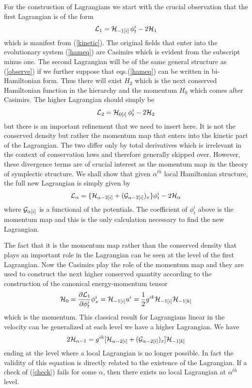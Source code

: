 \documentclass[a4paper,12pt]{article}
\begin{document}
For the construction of Lagrangians we start with the crucial
observation that the first Lagrangian is of the form
\begin{equation}
{\cal L}_1 = {\cal H}_{-1 [i]} \, \phi^i_t - 2 {\cal H}_1
\label{observe}
\end{equation}
which is manifest from (\ref{kinetic}). The original fields that
enter into the evolutionary system (\ref{hameq}) are Casimirs
which is evident from the subscript minus one. The second
Lagrangian will be of the same general structure as
(\ref{observe}) if we further suppose that eqs.(\ref{hameq}) can
be written in bi-Hamiltonian form. Thus there will exist $H_2$
which is the next conserved Hamiltonian function in the hierarchy
and the momentum $H_0$ which comes after Casimirs. The higher
Lagrangian should simply be $$ {\cal L}_2 = {\cal H}_{0 [i]} \,
\phi^i_t - 2 {\cal H}_2$$ but there is an important refinement
that we need to insert here. It is not the conserved density but
rather the momentum map that enters into the kinetic part of the
Lagrangian. The two differ only by total derivatives which is
irrelevant in the context of conservation laws and therefore
generally skipped over. However, these divergence terms are of
crucial interest as the momentum map in the theory of symplectic
structure. We shall show that given $\alpha^{th}$ local
Hamiltonian structure, the full new Lagrangian is simply given by
\begin{equation}
{\cal L}_\alpha = \{ {\cal H}_{\alpha-2 [i]} + ({\cal G}_{\alpha
-2  [i]} )_x \} \phi^i_t - 2 {\cal H}_{\alpha} \label{genexp}
\end{equation}
where ${\cal G}_{\alpha [i]}$ is a functional of the potentials.
The coefficient of $\phi^i_t$ above is the momentum map and this
is the only calculation necessary to find the new Lagrangian.

The fact that it is the momentum map rather than the conserved
density that plays an important role in the Lagrangian can be seen
at the level of the first Lagrangian. Now the Casimirs play the
role of the momentum map and they are used to construct the next
higher conserved quantity according to the construction of the
canonical energy-momentum tensor
$$ {\cal H}_0 = \frac{\partial {\cal L}_1}{\partial \phi^i_t}
\phi^i_x = {\cal H}_{-1 [i]} u^i = \frac{1}{2} g^{ik} {\cal H}_{-1
[i]}{\cal H}_{-1 [k]} $$ which is the momentum. This classical
result for Lagrangians linear in the velocity can be generalized
at each level we have a higher Lagrangian. We have
\begin{equation}
2 {\cal H}_{\alpha-1} = g^{ik} [  {\cal H}_{\alpha-2 [i]} + ({\cal
G}_{\alpha-2 [i] } )_x  ]  {\cal H}_{-1 [k]} \label{check}
\end{equation}
ending at the level where a local Lagrangian is no longer
possible. In fact the validity of this equation is directly
related to the existence of the Lagrangian. If a check of
(\ref{check}) fails for some $\alpha$, then there exists no local
Lagrangian at $\alpha^{th}$ level.
\end{document}
